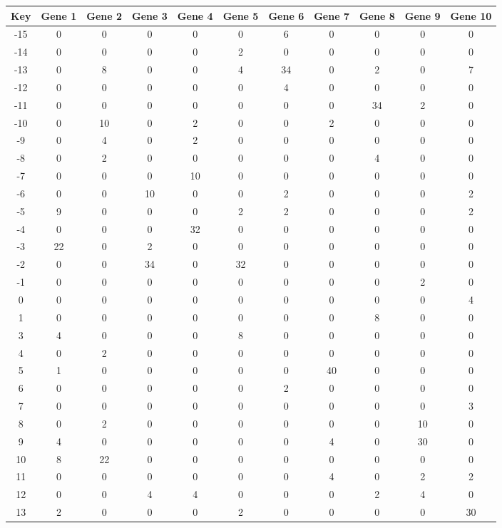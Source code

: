 \begin{tabular}{|c|c|c|c|c|c|c|c|c|c|c|}
\hline
Key & Gene 1 & Gene 2 & Gene 3 & Gene 4 & Gene 5 & Gene 6 & Gene 7 & Gene 8 & Gene 9 & Gene 10 \\
\hline
-15 & 0 & 0 & 0 & 0 & 0 & 6 & 0 & 0 & 0 & 0 \\
-14 & 0 & 0 & 0 & 0 & 2 & 0 & 0 & 0 & 0 & 0 \\
-13 & 0 & 8 & 0 & 0 & 4 & 34 & 0 & 2 & 0 & 7 \\
-12 & 0 & 0 & 0 & 0 & 0 & 4 & 0 & 0 & 0 & 0 \\
-11 & 0 & 0 & 0 & 0 & 0 & 0 & 0 & 34 & 2 & 0 \\
-10 & 0 & 10 & 0 & 2 & 0 & 0 & 2 & 0 & 0 & 0 \\
-9 & 0 & 4 & 0 & 2 & 0 & 0 & 0 & 0 & 0 & 0 \\
-8 & 0 & 2 & 0 & 0 & 0 & 0 & 0 & 4 & 0 & 0 \\
-7 & 0 & 0 & 0 & 10 & 0 & 0 & 0 & 0 & 0 & 0 \\
-6 & 0 & 0 & 10 & 0 & 0 & 2 & 0 & 0 & 0 & 2 \\
-5 & 9 & 0 & 0 & 0 & 2 & 2 & 0 & 0 & 0 & 2 \\
-4 & 0 & 0 & 0 & 32 & 0 & 0 & 0 & 0 & 0 & 0 \\
-3 & 22 & 0 & 2 & 0 & 0 & 0 & 0 & 0 & 0 & 0 \\
-2 & 0 & 0 & 34 & 0 & 32 & 0 & 0 & 0 & 0 & 0 \\
-1 & 0 & 0 & 0 & 0 & 0 & 0 & 0 & 0 & 2 & 0 \\
0 & 0 & 0 & 0 & 0 & 0 & 0 & 0 & 0 & 0 & 4 \\
1 & 0 & 0 & 0 & 0 & 0 & 0 & 0 & 8 & 0 & 0 \\
3 & 4 & 0 & 0 & 0 & 8 & 0 & 0 & 0 & 0 & 0 \\
4 & 0 & 2 & 0 & 0 & 0 & 0 & 0 & 0 & 0 & 0 \\
5 & 1 & 0 & 0 & 0 & 0 & 0 & 40 & 0 & 0 & 0 \\
6 & 0 & 0 & 0 & 0 & 0 & 2 & 0 & 0 & 0 & 0 \\
7 & 0 & 0 & 0 & 0 & 0 & 0 & 0 & 0 & 0 & 3 \\
8 & 0 & 2 & 0 & 0 & 0 & 0 & 0 & 0 & 10 & 0 \\
9 & 4 & 0 & 0 & 0 & 0 & 0 & 4 & 0 & 30 & 0 \\
10 & 8 & 22 & 0 & 0 & 0 & 0 & 0 & 0 & 0 & 0 \\
11 & 0 & 0 & 0 & 0 & 0 & 0 & 4 & 0 & 2 & 2 \\
12 & 0 & 0 & 4 & 4 & 0 & 0 & 0 & 2 & 4 & 0 \\
13 & 2 & 0 & 0 & 0 & 2 & 0 & 0 & 0 & 0 & 30 \\
\hline
\end{tabular}